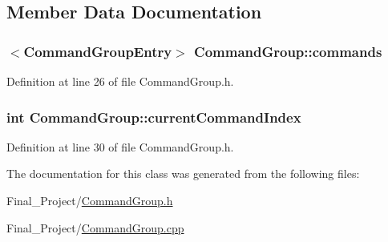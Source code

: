 \subsection{Member Data Documentation}
\hypertarget{classCommandGroup_a5906e7052c71befb25842e1f6c55e0b8}{
\subsubsection[{commands}]{$<${\bf Command\-Group\-Entry}$>$ Command\-Group\-::commands}}\label{classCommandGroup_a5906e7052c71befb25842e1f6c55e0b8}


Definition at line 26 of file Command\-Group.\-h.

\hypertarget{classCommandGroup_aeb8729b909aafeb23eafcfd0eec22c71}{
\subsubsection[{current\-Command\-Index}]{\setlength{\rightskip}{0pt plus 5cm}int Command\-Group\-::current\-Command\-Index\hspace{0.3cm}{\ttfamily [private]}}}\label{classCommandGroup_aeb8729b909aafeb23eafcfd0eec22c71}


Definition at line 30 of file Command\-Group.\-h.



The documentation for this class was generated from the following files\-:\begin{DoxyCompactItemize}
\item 
Final\-\_\-\-Project/\hyperlink{CommandGroup_8h}{Command\-Group.\-h}\item 
Final\-\_\-\-Project/\hyperlink{CommandGroup_8cpp}{Command\-Group.\-cpp}\end{DoxyCompactItemize}
